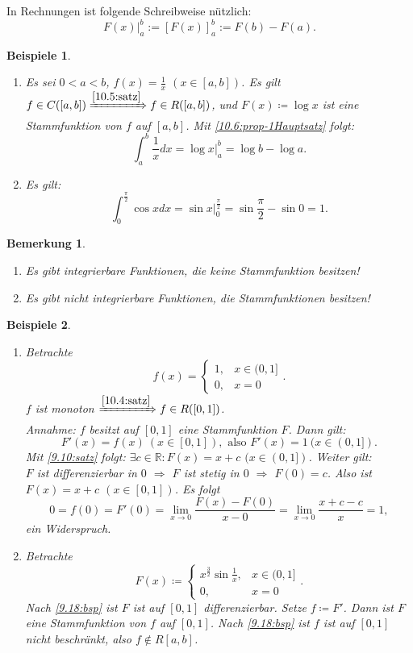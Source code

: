 \documentclass[12pt]{extreport} %
\newcommand{\R}{\mathbb{R}}
\theoremstyle{named}
\theoremstyle{itshape}
\theoremstyle{normal}
\newtheorem*{beispiele}{Beispiele}
\newtheorem*{bemerkung}{Bemerkung}
\begin{document}
{In Rechnungen ist folgende Schreibweise nützlich:
$$F(x) \Big|_{a}^{b} := \left[ F(x) \right]_{a}^{b}:= F(b)-F(a). $$

\begin{beispiele} ~\
	\begin{enumerate}
		\item Es sei $0 < a < b$, $f(x) = \frac{1}{x}$ $(x \in [a,b])$. Es gilt $f \in C([a, b]) \xRightarrow[]{\ref{10.5:satz}} f \in R([a, b])$, und
		$F(x) \coloneqq \log x$ ist eine Stammfunktion von $f$ auf $[a, b]$. Mit \ref{10.6:prop-1Hauptsatz} folgt:
			$$ \int_{a}^{b} \frac{1}{x} dx = \log x \Big|_{a}^{b} = \log b - \log a. $$
		\item  Es gilt: $$\int_{0}^{\frac{\pi}{2}} \cos x dx = \sin x \Big|_{0}^{\frac{\pi}{2}}= \sin \frac{\pi}{2} - \sin 0 = 1.$$
	\end{enumerate}
\end{beispiele}

\begin{bemerkung} ~\
\begin{enumerate}
	\item Es gibt integrierbare Funktionen, die keine Stammfunktion besitzen!
	\item Es gibt nicht integrierbare Funktionen, die Stammfunktionen besitzen!
\end{enumerate}
\end{bemerkung}

\begin{beispiele} ~\
	\begin{enumerate}
		\item Betrachte $$f(x) = \begin{cases} 1, & x \in (0, 1] \\ 0, & x = 0 \end{cases}.$$ 
			$f$ ist monoton $\xRightarrow[]{\ref{10.4:satz}} f \in R([0, 1])$. \\
			Annahme: $f$ besitzt auf $[0, 1]$ eine Stammfunktion $F$. Dann gilt:
			$$ F'(x) = f(x) ~ (x \in [0, 1]), \text{ also } F'(x) = 1  ~ (x \in (0, 1]). $$
			Mit \ref{9.10:satz} folgt: $\exists c \in \R: F(x) = x + c$ $(x \in (0, 1])$. Weiter gilt: \\
			$F$ ist differenzierbar in $0$ $\Rightarrow$ $F$ ist stetig in $0$ $\Rightarrow$ $F(0) = c$. Also ist $F(x) = x + c$ $(x \in [0, 1])$. 
			Es folgt
			$$ 0 = f(0) = F'(0) = \lim_{x \rightarrow 0} \frac{F(x) - F(0)}{x - 0} = \lim_{x \rightarrow 0} \frac{x + c - c}{x} = 1, $$
			ein Widerspruch.
		\item Betrachte 
		        $$F(x) \coloneqq \begin{cases} x^{\frac{3}{2}} \sin \frac{1}{x}, & x \in (0, 1] \\ 0, & x = 0 \end{cases}.$$
		        Nach \ref{9.18:bsp} ist $F$ ist auf $[0, 1]$ differenzierbar. Setze $f \coloneqq F'$. Dann ist $F$ eine Stammfunktion von $f$ auf $[0, 1]$.
		        Nach \ref{9.18:bsp} ist $f$ ist auf $[0, 1]$ nicht beschränkt, also $f \notin R[a, b]$. 
	\end{enumerate}	
\end{beispiele}



}
\end{document}
